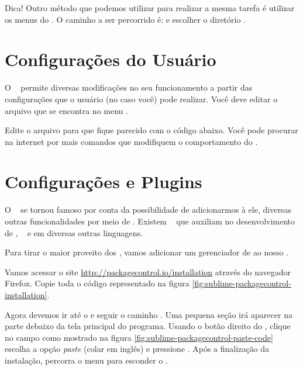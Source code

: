 Dica! Outro método que podemos utilizar para realizar a mesma tarefa é utilizar
os menus do \sublime. O caminho a ser percorrido é: 
e escolher o diretório .


\section{Configurações do Usuário}
\label{configuracoes-do-usuario}

O \sublime~ permite diversas modificações no seu funcionamento a partir das configurações
que o usuário (no caso você) pode realizar. Você deve editar o arquivo 
que se encontra no menu .

Edite o arquivo para que fique parecido com o código abaixo. Você pode procurar
na internet por mais comandos que modifiquem o comportamento do \sublime.



\section{Configurações e Plugins}
\label{configuracoes-e-plugins}

O \sublime~ se tornou famoso por conta da possibilidade de adicionarmos à ele,
diversas outras funcionalidades por meio de \plugins. Existem \plugins~ que auxiliam
no desenvolvimento de \html, \css~ e em diversas outras linguagens.

Para tirar o maior proveito dos \plugins, vamos adicionar um gerenciador de
\plugins ao nosso \sublime.

Vamos acessar o site \url{http://packagecontrol.io/installation} através do navegador 
Firefox. Copie toda o código representado na figura \ref{fig:sublime-packagecontrol-installation}.

Agora devemos ir até o \sublime e seguir o caminho .
Uma pequena seção irá aparecer na parte debaixo da tela principal do programa.
Usando o botão direito do \mouse, clique no campo como mostrado na figura 
\ref{fig:sublime-packagecontrol-paste-code} escolha a opção \textit{paste} (colar em inglês)
e pressione \avancar. Após a finalização da instalação, percorra o menu  
para esconder o \terminal.


